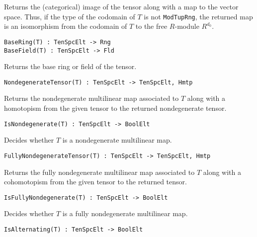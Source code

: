 Returns the (categorical) image of the tensor along with a map to the vector space.
Thus, if the type of the codomain of $T$ is not {\tt ModTupRng}, the returned map
is an isomorphism from the codomain of $T$ to the free $R$-module $R^{d_0}$. 

\color{blue}
{\small \begin{verbatim}
BaseRing(T) : TenSpcElt -> Rng
BaseField(T) : TenSpcElt -> Fld
\end{verbatim} }
\color{black}

Returns the base ring or field of the tensor.

\color{blue}
{\small \begin{verbatim}
NondegenerateTensor(T) : TenSpcElt -> TenSpcElt, Hmtp
\end{verbatim} }
\color{black}

Returns the nondegenerate multilinear map associated to $T$ along with a homotopism 
from the given tensor to the returned nondegenerate tensor.

\color{blue}
{\small \begin{verbatim}
IsNondegenerate(T) : TenSpcElt -> BoolElt
\end{verbatim} }
\color{black}

Decides whether $T$ is a nondegenerate multilinear map.

\color{blue}
{\small \begin{verbatim}
FullyNondegenerateTensor(T) : TenSpcElt -> TenSpcElt, Hmtp
\end{verbatim} }
\color{black}

Returns the fully nondegenerate multilinear map associated to $T$ along with a
cohomotopism from the given tensor to the returned tensor.

\color{blue}
{\small \begin{verbatim}
IsFullyNondegenerate(T) : TenSpcElt -> BoolElt
\end{verbatim} }
\color{black}

Decides whether $T$ is a fully nondegenerate multilinear map.

\color{blue}
{\small \begin{verbatim}
IsAlternating(T) : TenSpcElt -> BoolElt
\end{verbatim} }
\color{black}


